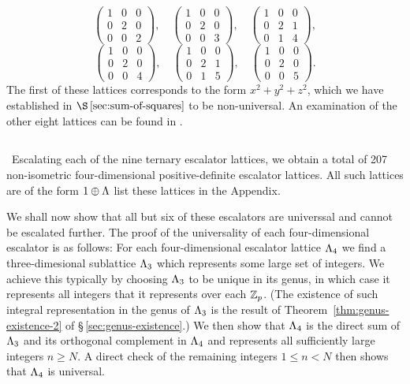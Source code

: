 \[
    \begin{pmatrix}
        1 & 0 & 0 \\
        0 & 2 & 0 \\
        0 & 0 & 2
    \end{pmatrix}, \quad
    \begin{pmatrix}
        1 & 0 & 0 \\
        0 & 2 & 0 \\
        0 & 0 & 3
    \end{pmatrix}, \quad
    \begin{pmatrix}
        1 & 0 & 0 \\
        0 & 2 & 1 \\
        0 & 1 & 4
    \end{pmatrix},
\]
\[
    \begin{pmatrix}
        1 & 0 & 0 \\
        0 & 2 & 0 \\
        0 & 0 & 4
    \end{pmatrix}, \quad
    \begin{pmatrix}
        1 & 0 & 0 \\
        0 & 2 & 1 \\
        0 & 1 & 5
    \end{pmatrix}, \quad
    \begin{pmatrix}
        1 & 0 & 0 \\
        0 & 2 & 0 \\
        0 & 0 & 5
    \end{pmatrix}.
\]
The first of these lattices corresponds to the form \(x^2 + y^2 + z^2\), which
we have established in \(\S\,\ref{sec:sum-of-squares}\) to be non-universal. An
examination of the other eight lattices can be found in
\cite{dickson1927integers}.
 
\subsection{}~Escalating each of the nine ternary escalator lattices, we obtain
a total of 207 non-isometric four-dimensional positive-definite escalator
lattices. All such lattices are of the form \(1 \oplus \Lambda\) list these
lattices in the Appendix.

We shall now show that all but six of these escalators are universsal and cannot
be escalated further. The proof of the universality of each four-dimensional
escalator is as follows: For each four-dimensional escalator lattice
\(\Lambda_4\) we find a three-dimesional sublattice \(\Lambda_3\) which
represents some large set of integers. We achieve this typically by choosing
\(\Lambda_3\) to be unique in its genus, in which case it represents all
integers that it represents over each \(\mathbb{Z}_p\). (The existence of such
integral representation in the genus of \(\Lambda_3\) is the result of
Theorem~\ref{thm:genus-existence-2} of \S\,\ref{sec:genus-existence}.) We then
show that \(\Lambda_4\) is the direct sum of \(\Lambda_3\) and its orthogonal
complement in \(\Lambda_4\) and represents all sufficiently large integers \(n
\geq N\). A direct check of the remaining integers \(1 \leq n < N\) then shows
that \(\Lambda_4\) is universal.

